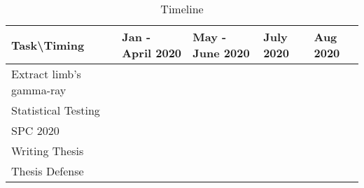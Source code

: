 \begin{table}[h!]
\begin{center}
    \begin{tabular}{|l|l|l|l|l|}
    \hline
    Task\textbackslash{}Timing & Jan - April 2020         & May - June 2020                                  & July 2020                                       & Aug 2020                 \\ \hline
    Extract limb's gamma-ray   & \cellcolor[HTML]{FD6864} &                                                  &                                                 &                          \\ \hline
    Statistical Testing        &                          & \cellcolor[HTML]{32CB00}                         &                                                 &                          \\ \hline
    SPC 2020                   &                          & \cellcolor[HTML]{34CDF9}{\color[HTML]{333333} }  &                                                 &                          \\ \hline
    Writing Thesis             &                          &                                                  & \cellcolor[HTML]{6665CD}{\color[HTML]{333333} } &                          \\ \hline
    Thesis Defense             &                          &                                                  &                                                 & \cellcolor[HTML]{67FD9A} \\ \hline
    \end{tabular}
\end{center}
\caption{Timeline}
\end{table}